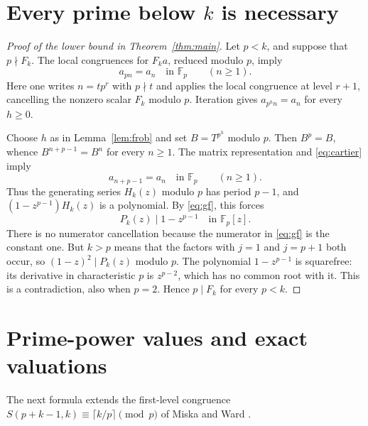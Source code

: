 \documentclass[11pt]{article}
\theoremstyle{remark}
\begin{document}
\section{Every prime below \texorpdfstring{$k$}{k} is necessary}
\begin{proof}[Proof of the lower bound in Theorem~\ref{thm:main}]
Let $p<k$, and suppose that $p\nmid F_k$. The local congruences for $F_ka$,
reduced modulo $p$, imply
\begin{equation}\label{eq:cartier}
 a_{pn}=a_n\quad\text{in }\mathbb F_p\qquad(n\geq1).
\end{equation}
Here one writes $n=tp^r$ with $p\nmid t$ and applies the local congruence
at level $r+1$, cancelling the nonzero scalar $F_k$ modulo $p$.
Iteration gives $a_{p^h n}=a_n$ for every $h\geq0$.

Choose $h$ as in Lemma~\ref{lem:frob} and set $B=T^{p^h}$ modulo $p$.
Then $B^p=B$, whence
$B^{n+p-1}=B^n$ for every $n\geq1$.
The matrix representation and \eqref{eq:cartier} imply
\[
 a_{n+p-1}=a_n\quad\text{in }\mathbb F_p\qquad(n\geq1).
\]
Thus the generating series $H_k(z)$ modulo $p$ has period $p-1$, and
$(1-z^{p-1})H_k(z)$ is a polynomial. By \eqref{eq:gf}, this forces
\[
 P_k(z)\mid1-z^{p-1}\quad\text{in }\mathbb F_p[z].
\]
There is no numerator cancellation because the numerator in \eqref{eq:gf}
is the constant one. But $k>p$ means that the factors with $j=1$ and
$j=p+1$ both occur, so $(1-z)^2\mid P_k(z)$ modulo $p$.
The polynomial $1-z^{p-1}$ is squarefree: its derivative in characteristic
$p$ is $z^{p-2}$, which has no common root with it. This is a contradiction,
also when $p=2$. Hence $p\mid F_k$ for every $p<k$.
\end{proof}

\section{Prime-power values and exact valuations}
The next formula extends the first-level congruence
$S(p+k-1,k)\equiv\lceil k/p\rceil\pmod p$ of Miska and Ward
\cite[proof of Lemma~2.5]{MW}.
\end{document}
